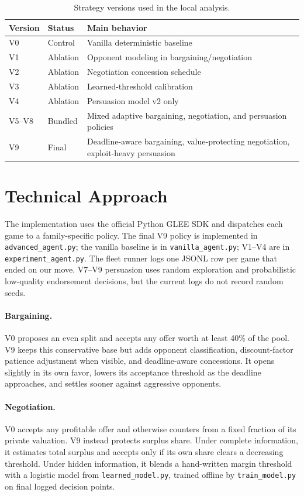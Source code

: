 \documentclass{article}
\begin{document}
\begin{table}[H]
\caption{Strategy versions used in the local analysis.}
\label{tab:versions}
\centering
\small
\begin{tabular}{lll}
\toprule
Version & Status & Main behavior \\
\midrule
V0 & Control & Vanilla deterministic baseline \\
V1 & Ablation & Opponent modeling in bargaining/negotiation \\
V2 & Ablation & Negotiation concession schedule \\
V3 & Ablation & Learned-threshold calibration \\
V4 & Ablation & Persuasion model v2 only \\
V5--V8 & Bundled & Mixed adaptive bargaining, negotiation, and persuasion policies \\
V9 & Final & Deadline-aware bargaining, value-protecting negotiation, exploit-heavy persuasion \\
\bottomrule
\end{tabular}
\end{table}

\section{Technical Approach}

The implementation uses the official Python GLEE SDK and dispatches each game to a family-specific policy. The final V9 policy is implemented in \texttt{advanced\_agent.py}; the vanilla baseline is in \texttt{vanilla\_agent.py}; V1--V4 are in \texttt{experiment\_agent.py}. The fleet runner logs one JSONL row per game that ended on our move. V7--V9 persuasion uses random exploration and probabilistic low-quality endorsement decisions, but the current logs do not record random seeds.

\paragraph{Bargaining.}
V0 proposes an even split and accepts any offer worth at least 40\% of the pool. V9 keeps this conservative base but adds opponent classification, discount-factor patience adjustment when visible, and deadline-aware concessions. It opens slightly in its own favor, lowers its acceptance threshold as the deadline approaches, and settles sooner against aggressive opponents.

\paragraph{Negotiation.}
V0 accepts any profitable offer and otherwise counters from a fixed fraction of its private valuation. V9 instead protects surplus share. Under complete information, it estimates total surplus and accepts only if its own share clears a decreasing threshold. Under hidden information, it blends a hand-written margin threshold with a logistic model from \texttt{learned\_model.py}, trained offline by \texttt{train\_model.py} on final logged decision points.
\end{document}

